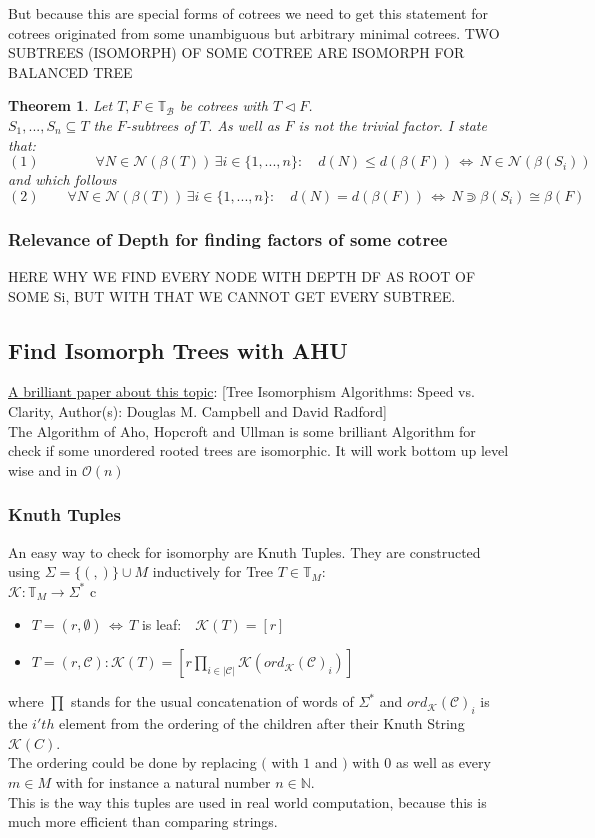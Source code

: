 \documentclass[a4paper,12pt]{article}
\newtheorem{theorem}{Theorem}[section]
\theoremstyle{definition}
\begin{document}
		But because this are special forms of cotrees we need to get this statement for cotrees originated from some unambiguous but arbitrary minimal cotrees. 
		TWO SUBTREES (ISOMORPH) OF SOME COTREE ARE ISOMORPH FOR BALANCED TREE
		\begin{theorem}
			Let $T,F\in\mathds{T}_{\mathcal{B}}$ be cotrees with $T\vartriangleleft F$.\\ $S_1,...,S_n\subseteq T$ the $F$-subtrees of $T$. As well as $F$ is not the trivial factor. I state that:
			\[(1)\qquad \qquad \forall N\in \mathcal{N}(\beta(T))\, \exists i\in\{1,...,n\}:\quad d(N)\leq d(\beta(F))\,\Longleftrightarrow\, N\in \mathcal{N}(\beta(S_i)) \]
			and which follows
			\[(2)\qquad \forall N\in \mathcal{N}(\beta(T))\, \exists i\in\{1,...,n\}:\quad d(N)= d(\beta(F))\,\Longleftrightarrow\, N \Supset \beta(S_i)\cong \beta(F) \]
		\end{theorem}
		\subsubsection{Relevance of Depth for finding factors of some cotree}
		HERE WHY WE FIND EVERY NODE WITH DEPTH DF AS ROOT OF SOME Si, BUT WITH THAT WE CANNOT GET EVERY SUBTREE.
		
	\subsection{Find Isomorph Trees with AHU}
	\hyperlink{www.jstor.org/stable/pdf/2690833.pdf}{A brilliant paper about this topic}: [Tree Isomorphism Algorithms: Speed vs. Clarity,\quad
	Author(s): Douglas M. Campbell and David Radford]\\
	The Algorithm of Aho, Hopcroft and Ullman is some brilliant Algorithm for check if some unordered rooted trees are isomorphic. It will work bottom up level wise and in $\mathcal{O}(n)$
	\subsubsection{Knuth Tuples}
	An easy way to check for isomorphy are Knuth Tuples. They are constructed using $\Sigma =\{(,)\}\cup M$ inductively for Tree $T\in \mathds{T}_M$:\\
	$\mathcal{K}: \mathds{T}_M \longrightarrow \Sigma^*$
	c\begin{itemize}
		\item $T=(r,\emptyset)\,\Leftrightarrow\, T$  is leaf:$\quad \mathcal{K} (T) =[r]$
		\item $T=(r,\mathcal{C}): \mathcal{K}(T)=[r \prod_{i\in |\mathcal{C}|} \mathcal K(ord_{\mathcal{K}}(\mathcal{C})_i)]$
	\end{itemize}
	where $\prod$ stands for the usual concatenation of words of $\Sigma^*$ and $ord_{\mathcal{K}}(\mathcal{C})_i$ is the $i'th$ element from the ordering of the children after their Knuth String $\mathcal{K}(C)$.\\
	The ordering could be done by replacing $($ with $1$ and $)$ with $0$ as well as every $m\in M$ with for instance a natural number $n\in \mathds{N}$.\\
	This is the way this tuples are used in real world computation, because this is much more efficient than comparing strings.
\end{document}

